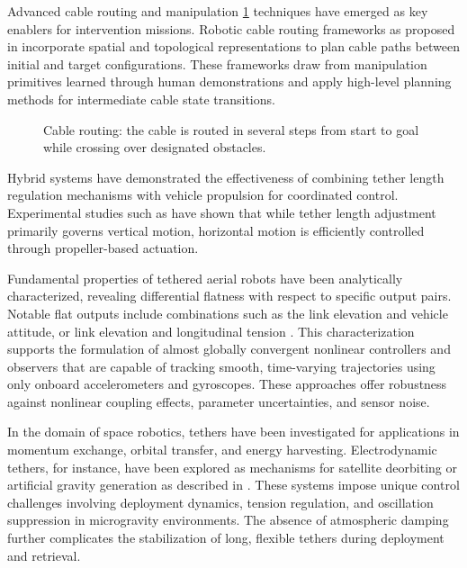 Advanced cable routing and manipulation \cref{sota_c_tuuvc_cable_routing} techniques have emerged
as key enablers for intervention missions. Robotic cable routing frameworks as proposed in
\cite{jinRoboticCableRouting2022} incorporate spatial and topological representations to plan cable
paths between initial and target configurations. These frameworks draw from manipulation primitives
learned through human demonstrations and apply high-level planning methods for intermediate cable
state transitions.

\begin{figure}
	\centering
	\caption{
		Cable routing: the cable is routed in several steps from start to goal while crossing over
		designated obstacles.
	}
	\label{sota_c_tuuvc_cable_routing}
\end{figure}

Hybrid systems have demonstrated the effectiveness of combining tether length regulation mechanisms
with vehicle propulsion for coordinated control. Experimental studies such as
\cite{wuTrajectoryFollowingTethered2019} have shown that while tether length adjustment primarily
governs vertical motion, horizontal motion is efficiently controlled through propeller-based
actuation.

Fundamental properties of tethered aerial robots have been analytically characterized, revealing
differential flatness with respect to specific output pairs. Notable flat outputs include
combinations such as the link elevation and vehicle attitude, or link elevation and longitudinal
tension \parencite{tognonDynamicsControlEstimation2017}. This characterization supports the
formulation of almost globally convergent nonlinear controllers and observers that are capable of
tracking smooth, time-varying trajectories using only onboard accelerometers and gyroscopes. These
approaches offer robustness against nonlinear coupling effects, parameter uncertainties, and sensor
noise.

In the domain of space robotics, tethers have been investigated for applications in momentum
exchange, orbital transfer, and energy harvesting. Electrodynamic tethers, for instance, have been
explored as mechanisms for satellite deorbiting or artificial gravity generation as described in
\cite{modiDeploymentDynamicsTether1979,huangDexterousTetheredSpace2017}. These systems impose
unique control challenges involving deployment dynamics, tension regulation, and oscillation
suppression in microgravity environments. The absence of atmospheric damping further complicates
the stabilization of long, flexible tethers during deployment and retrieval.


